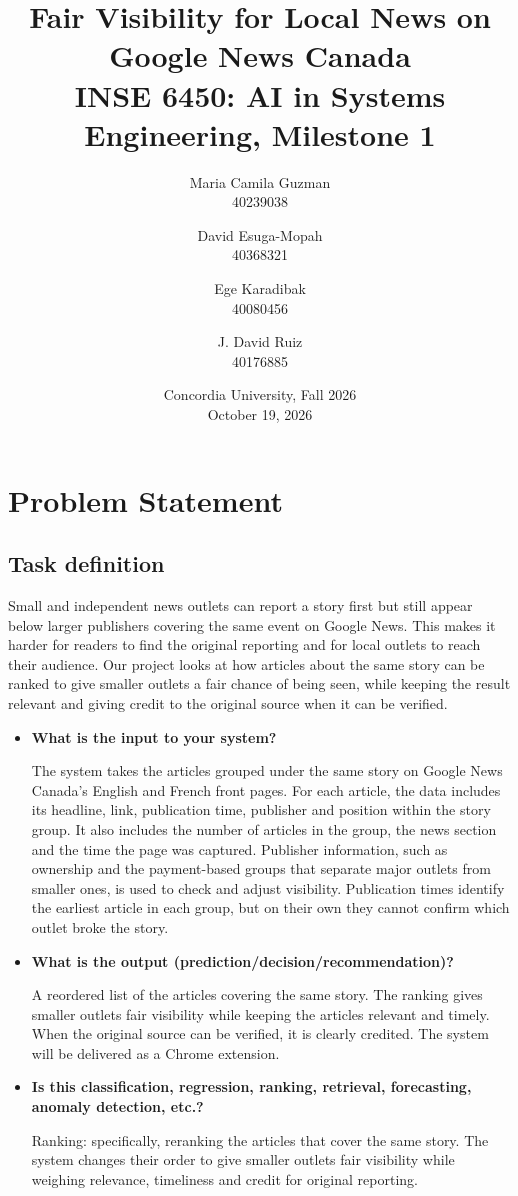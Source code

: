 \documentclass[11pt,letterpaper]{article}
\title{Fair Visibility for Local News on Google News Canada\\[4pt]
\large INSE 6450: AI in Systems Engineering, Milestone 1}
\author{
Maria Camila Guzman \\ \small 40239038 \and
David Esuga-Mopah \\ \small 40368321 \and
Ege Karadibak \\ \small 40080456 \and
J. David Ruiz \\ \small 40176885}
\date{Concordia University, Fall 2026 \\ October 19, 2026}
\newcommand{\q}[1]{\item \textbf{#1}\par}
\begin{document}
\maketitle


\section{Problem Statement}

\subsection*{Task definition}
Small and independent news outlets can report a story first but still appear below larger publishers covering the same event on Google News. This makes it harder for readers to find the original reporting and for local outlets to reach their audience. Our project looks at how articles about the same story can be ranked to give smaller outlets a fair chance of being seen, while keeping the result relevant and giving credit to the original source when it can be verified.

\begin{itemize}
\q{What is the input to your system?}
The system takes the articles grouped under the same story on Google News Canada's English and French front pages. For each article, the data includes its headline, link, publication time, publisher and position within the story group. It also includes the number of articles in the group, the news section and the time the page was captured. Publisher information, such as ownership and the payment-based groups that separate major outlets from smaller ones, is used to check and adjust visibility. Publication times identify the earliest article in each group, but on their own they cannot confirm which outlet broke the story.

\q{What is the output (prediction/decision/recommendation)?}
A reordered list of the articles covering the same story. The ranking gives smaller outlets fair visibility while keeping the articles relevant and timely. When the original source can be verified, it is clearly credited. The system will be delivered as a Chrome extension.

\q{Is this classification, regression, ranking, retrieval, forecasting, anomaly detection, etc.?}
Ranking: specifically, reranking the articles that cover the same story. The system changes their order to give smaller outlets fair visibility while weighing relevance, timeliness and credit for original reporting.
\end{itemize}
\end{document}
